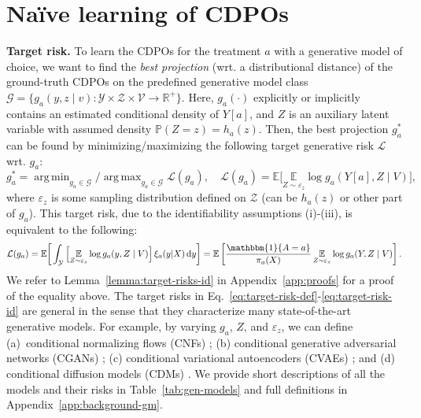 \documentclass[dvipsnames]{article} %
\DeclareMathOperator*{\argmax}{arg\,max}
\DeclareMathOperator*{\argmin}{arg\,min}
\newcommand*\diff{\mathop{}\!\mathrm{d}}
\newcommand{\CDPOs}{CDPOs\xspace}
\begin{document}
\section{Na\"ive learning of CDPOs} 
\textbf{Target risk.} To learn the \CDPOs for the treatment $a$ with a generative model of choice, we want to find the \emph{best projection} (wrt. a distributional distance) of the ground-truth \CDPOs on the predefined generative model class $\mathcal{G} = \{g_a(y, z \mid v): \mathcal{Y} \times \mathcal{Z} \times \mathcal{V} \to \mathbb{R}^{+}\}$. 
Here, $g_a(\cdot)$ explicitly or implicitly contains an estimated conditional density of $Y[a]$, and $Z$ is an auxiliary latent variable with assumed density $\mathbb{P}(Z = z) = h_a(z)$.
Then, the best projection $g^*_a$ can be found by minimizing/maximizing the following target generative risk $\mathcal{L}$ wrt. $g_a$:  
\begin{equation}  \label{eq:target-risk-def}
    g_a^* = \argmin_{g_a \in \mathcal{G}}/\argmax_{g_a \in \mathcal{G}} \mathcal{L}(g_a), \quad \mathcal{L}(g_a)=  \mathbb{E} \big[ \underset{Z \sim \varepsilon_z }{\mathbb{E}}\log g_a(Y[a], Z \mid V) \big],
\end{equation}
where $\varepsilon_z$ is some sampling distribution defined on $\mathcal{Z}$ (can be $h_a(z)$ or other part of $g_a$). This target risk, due to the identifiability assumptions (i)-(iii), is equivalent to the following:
\begingroup\makeatletter\def\f@size{9}\check@mathfonts
\begin{equation} \label{eq:target-risk-id}
    \mathcal{L}(g_a)= \mathbb{E} \bigg[ \int_\mathcal{Y} \Big[\underset{Z \sim \varepsilon_z }{\mathbb{E}} \log g_a(y, Z \mid V) \Big] \, \xi_a(y | X) \diff{y} \bigg] = \mathbb{E}\left[\frac{\mathbbm{1}\{A = a\}}{\pi_a(X)} \, \underset{Z \sim \varepsilon_z }{\mathbb{E}} \log g_a(Y, Z \mid V)\right].
\end{equation}
\endgroup
We refer to Lemma~\ref{lemma:target-risks-id} in Appendix~\ref{app:proofs} for a proof of the equality above. The target risks in Eq.~\eqref{eq:target-risk-def}-\eqref{eq:target-risk-id} are general in the sense that they characterize many state-of-the-art generative models. For example, by varying $g_a$, $Z$, and $\varepsilon_z$, we can define (a)~conditional normalizing flows (CNFs) \citep{rezende2015variational,trippe2018conditional}; (b) conditional generative adversarial networks (CGANs) \citep{goodfellow2014generative, laria2022transferring}; (c) conditional variational autoencoders (CVAEs) \citep{kingma2014auto,oh2022cvae}; and  (d) conditional diffusion models (CDMs) \citep{ho2020denoising,lutati2023ocd}. We provide short descriptions of all the models and their risks in Table~\ref{tab:gen-models} and full definitions in Appendix~\ref{app:background-gm}.
\end{document}
